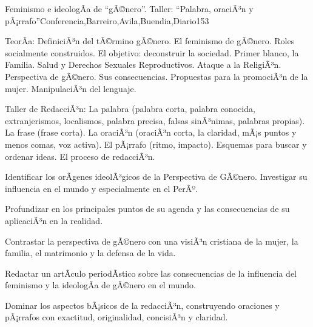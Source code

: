 \begin{syllabus}
\begin{unit}{Feminismo e ideologÃ­a de ``gÃ©nero''. Taller: ``Palabra, oraciÃ³n y pÃ¡rrafo''}{Conferencia,Barreiro,Avila,Buendia,Diario}{15}{3}
\begin{topics}
	\item TeorÃ­a: 
		\subitem DefiniciÃ³n del tÃ©rmino gÃ©nero. El feminismo de gÃ©nero. Roles socialmente construidos. El objetivo: deconstruir la sociedad. Primer blanco, la Familia. Salud y Derechos Sexuales Reproductivos. Ataque a la ReligiÃ³n.
		\subitem Perspectiva de gÃ©nero. Sus consecuencias. Propuestas para la promociÃ³n de la mujer.
		\subitem ManipulaciÃ³n del lenguaje.

	\item Taller de RedacciÃ³n:
 		\subitem La palabra (palabra corta, palabra conocida, extranjerismos, localismos, palabra precisa, falsas sinÃ³nimas, palabras propias).
 		\subitem La frase (frase corta).
 		\subitem La oraciÃ³n (oraciÃ³n corta, la claridad, mÃ¡s puntos y menos comas, voz activa).
 		\subitem El pÃ¡rrafo (ritmo, impacto). 
 		\subitem Esquemas para buscar y ordenar ideas.
 		\subitem El proceso de redacciÃ³n.
\end{topics}
\begin{unitgoals}
	\item Identificar los orÃ­genes ideolÃ³gicos de la Perspectiva de GÃ©nero. Investigar su influencia en el mundo y especialmente en el PerÃº. 	
	\item Profundizar en los principales puntos de su agenda y las consecuencias de su aplicaciÃ³n en la realidad. 	
	\item Contrastar la perspectiva de gÃ©nero con una visiÃ³n cristiana de la mujer, la familia, el matrimonio y la defensa de la vida.
	\item Redactar un artÃ­culo periodÃ­stico sobre las consecuencias de la influencia del feminismo y la ideologÃ­a de gÃ©nero en el mundo. 	
	\item Dominar los aspectos bÃ¡sicos de la redacciÃ³n, construyendo oraciones y pÃ¡rrafos con exactitud, originalidad, concisiÃ³n y claridad.

\end{unitgoals}
\end{unit}


\end{syllabus}
